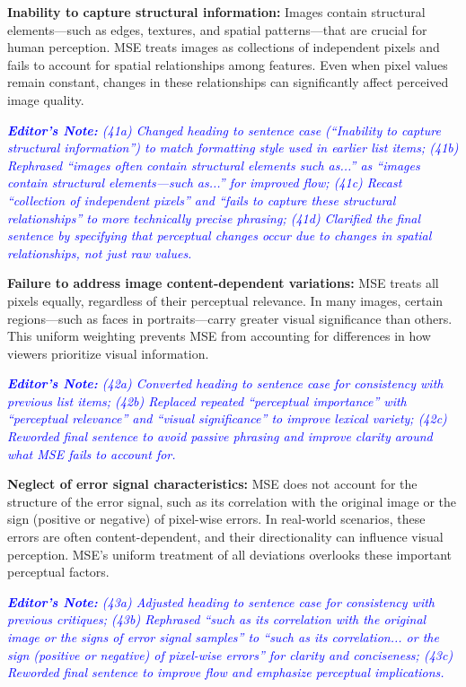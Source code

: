 \documentclass[journal,12pt,onecolumn,draftcls]{IEEEtran}
\newcommand{\editornote}[1]{\par\textit{\textcolor{blue}{\textbf{Editor's Note:} #1}}\par}
\begin{document}
\textbf{Inability to capture structural information:} Images contain structural elements—such as edges, textures, and spatial patterns—that are crucial for human perception. MSE treats images as collections of independent pixels and fails to account for spatial relationships among features. Even when pixel values remain constant, changes in these relationships can significantly affect perceived image quality.

\editornote{(41a) Changed heading to sentence case (“Inability to capture structural information”) to match formatting style used in earlier list items;
(41b) Rephrased “images often contain structural elements such as...” as “images contain structural elements—such as...” for improved flow;
(41c) Recast “collection of independent pixels” and “fails to capture these structural relationships” to more technically precise phrasing;
(41d) Clarified the final sentence by specifying that perceptual changes occur due to changes in spatial relationships, not just raw values.}

\textbf{Failure to address image content-dependent variations:} MSE treats all pixels equally, regardless of their perceptual relevance. In many images, certain regions—such as faces in portraits—carry greater visual significance than others. This uniform weighting prevents MSE from accounting for differences in how viewers prioritize visual information.

\editornote{(42a) Converted heading to sentence case for consistency with previous list items;
(42b) Replaced repeated “perceptual importance” with “perceptual relevance” and “visual significance” to improve lexical variety;
(42c) Reworded final sentence to avoid passive phrasing and improve clarity around what MSE fails to account for.}

\textbf{Neglect of error signal characteristics:} MSE does not account for the structure of the error signal, such as its correlation with the original image or the sign (positive or negative) of pixel-wise errors. In real-world scenarios, these errors are often content-dependent, and their directionality can influence visual perception. MSE’s uniform treatment of all deviations overlooks these important perceptual factors.

\editornote{(43a) Adjusted heading to sentence case for consistency with previous critiques;
(43b) Rephrased “such as its correlation with the original image or the signs of error signal samples” to “such as its correlation... or the sign (positive or negative) of pixel-wise errors” for clarity and conciseness;
(43c) Reworded final sentence to improve flow and emphasize perceptual implications.}
\end{document}
